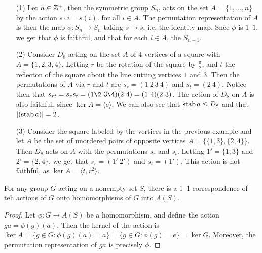 \begin{example}\label{example_4.3}
  \begin{enumerate}
    \item[(1)] Let $n \in \mathbb{Z}^+$, then the symmetric group $S_n$, acts on the
      set $A=\{1, \dots, n\}$ by the action $s \cdot i=s(i)$. for all $i
      \in A$. The permutation representation of $A$ is then the map
      $\phi:S_n \rightarrow S_n$ taking $s \rightarrow s$; i.e. the
      identity map. Snce $\phi$ is  $1$--$1$, we get that $\phi$ is
      faithful, and that for each $i \in A$, the  \simeq
      $S_{n-1}$.

    \item[(2)] Consider $D_8$ acting on the set $A$ of  $4$ vertices of a
      square with  $A=\{1,2,3,4\}$. Letting $r$ be the rotation of the square
      by  $\frac{\pi}{2}$, and $t$ the reflecton of the square about the
      line cutting vertices $1$ and $3$. Then the permutations of $A$ via
      $r$ and  $t$ are  $s_r=(1 \ 2 \ 3 \ 4)$ and $s_t = (2 \ 4)$. Notice then
      that $s_{rt}=s_rs_t=(1 \2 \ 3 \4)(2 \ 4)=(1 \ 4)(2 \ 3)$. The action of
      $D_8$ on $A$ is also faithful, since  $\ker{A}=\langle e \rangle$. We can also
      see that $\operatorname{stab}{a} \leq D_8$ and that $|(\operatorname{stab}{a})|=2$.

    \item[(3)] Consider the square labeled by the vertices in the
      previous example and let $A$ be the set of unordered pairs of opposite
      vertices  $A=\{\{1,3\}, \{2,4\}\}$. Then $D_8$ acts on $A$ with the
      permutations $s_r$ and  $s_t$. Letting  $1'=\{1,3\}$ and $2'=\{2,4\}$,
      we get that $s_r=(1' \ 2')$ and $s_t=(1')$. This action is not faithful,
      as $\ker{A}=\langle t ,r^2 \rangle$.
  \end{enumerate}
\end{example}

\begin{theorem}\label{lemma_4.1.3}
  For any group $G$ acting on a nonempty set $S$, there is a 1--1 correspondence
  of teh actions of  $G$ onto homomorphisms of  $G$ into $A(S)$.
\end{theorem}
\begin{proof}
  Let $\phi:G \rightarrow A(S)$ be a homomorphism, and define the action
  $ga=\phi(g)(a)$. Then the kernel of the action is $\ker{A}=\{g \in G :
  \phi(g)(a)=a\}=\{g \in G : \phi(g)=e\}=\ker{G}$. Moreover, the permutation
  representation of $ga$ is precisely  $\phi$.
\end{proof}

